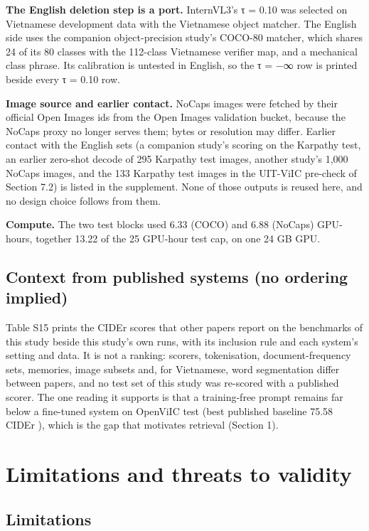 \textbf{The English deletion step is a port.} InternVL3's τ = 0.10 was selected on Vietnamese
development data with the Vietnamese object matcher. The English side uses the companion
object-precision study's COCO-80 matcher, which shares 24 of its 80 classes with the 112-class
Vietnamese verifier map, and a mechanical class phrase. Its calibration is untested in English, so
the τ = −∞ row is printed beside every τ = 0.10 row.

\textbf{Image source and earlier contact.} NoCaps images were fetched by their official Open Images
ids from the Open Images validation bucket, because the NoCaps proxy no longer serves them; bytes or
resolution may differ. Earlier contact with the English sets (a companion study's scoring on the
Karpathy test, an earlier zero-shot decode of 295 Karpathy test images, another study's 1,000 NoCaps
images, and the 133 Karpathy test images in the UIT-ViIC pre-check of Section 7.2) is listed in the
supplement. None of those outputs is reused here, and no design choice follows from them.

\textbf{Compute.} The two test blocks used 6.33 (COCO) and 6.88 (NoCaps) GPU-hours, together 13.22
of the 25 GPU-hour test cap, on one 24 GB GPU.

\subsection{Context from published systems (no ordering
implied)}\label{context-from-published-systems-no-ordering-implied}

Table S15 prints the CIDEr scores that other papers report on the benchmarks of this study beside
this study's own runs, with its inclusion rule and each system's setting and data. It is not a
ranking: scorers, tokenisation, document-frequency sets, memories, image subsets and, for
Vietnamese, word segmentation differ between papers, and no test set of this study was re-scored
with a published scorer. The one reading it supports is that a training-free prompt remains far
below a fine-tuned system on OpenViIC test (best published baseline 75.58 CIDEr
\citep{Bui2023OpenViIC}), which is the gap that motivates retrieval (Section 1).

\section{Limitations and threats to validity}\label{limitations-and-threats-to-validity}

\subsection{Limitations}\label{limitations}

